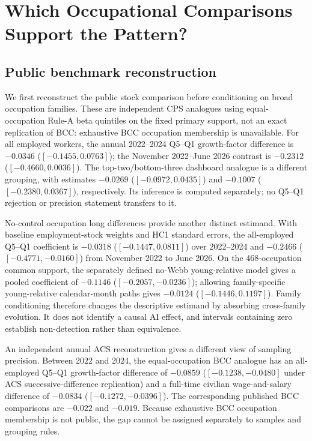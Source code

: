 \section{Which Occupational Comparisons Support the Pattern?}\label{sec:results}

\subsection{Public benchmark reconstruction}\label{subsec:public_benchmark}

We first reconstruct the public stock comparison before conditioning on broad
occupation families.  These are independent CPS analogues using equal-occupation
Rule-A beta quintiles on the fixed primary support, not an exact replication of
BCC: exhaustive BCC occupation membership is unavailable.  For all employed
workers, the annual 2022--2024 Q5--Q1 growth-factor difference is $-0.0346$
($[-0.1455,0.0763]$); the November 2022--June 2026 contrast is $-0.2312$
($[-0.4660,0.0036]$).  The top-two/bottom-three dashboard analogue is a
different grouping, with estimates $-0.0269$ ($[-0.0972,0.0435]$) and
$-0.1007$ ($[-0.2380,0.0367]$), respectively.  Its inference is computed
separately; no Q5--Q1 rejection or precision statement transfers to it.

No-control occupation long differences provide another distinct estimand.  With
baseline employment-stock weights and HC1 standard errors, the all-employed
Q5--Q1 coefficient is $-0.0318$ ($[-0.1447,0.0811]$) over 2022--2024 and
$-0.2466$ ($[-0.4771,-0.0160]$) from November 2022 to June 2026.  On the
468-occupation common support, the separately defined no-Webb young-relative
model gives a pooled coefficient of $-0.1146$ ($[-0.2057,-0.0236]$); allowing
family-specific young-relative calendar-month paths gives $-0.0124$
($[-0.1446,0.1197]$).  Family conditioning therefore changes the descriptive
estimand by absorbing cross-family evolution.  It does not identify a causal AI
effect, and intervals containing zero establish non-detection rather than
equivalence.

An independent annual ACS reconstruction gives a different view of sampling
precision.  Between 2022 and 2024, the equal-occupation BCC analogue has an
all-employed Q5--Q1 growth-factor difference of $-0.0859$
($[-0.1238,-0.0480]$ under ACS successive-difference replication) and a
full-time civilian wage-and-salary difference of $-0.0834$
($[-0.1272,-0.0396]$).  The corresponding published BCC comparisons are
$-0.022$ and $-0.019$.  Because exhaustive BCC occupation membership is not
public, the gap cannot be assigned separately to samples and grouping rules.

